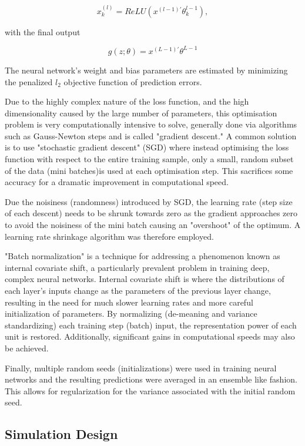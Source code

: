 \documentclass[man, a4paper, biblatex]{article}
\begin{document}
\begin{equation}
	x_k^{(l)} = ReLU(x^{(l-1)'}\theta_k^{l-1}),
\end{equation}

with the final output

\begin{equation}
	g(z;\theta) = x^{(L-1)'}\theta^{L-1}
\end{equation}

The neural network's weight and bias parameters are estimated by minimizing the penalized $l_2$ objective function of prediction errors.

Due to the highly complex nature of the loss function, and the high dimensionality caused by the large number of parameters, this optimisation problem is very computationally intensive to solve, generally done via algorithms such as Gauss-Newton steps and is called "gradient descent." A common solution is to use "stochastic gradient descent" (SGD) where instead optimising the loss function with respect to the entire training sample, only a small, random subset of the data (mini batches)is used at each optimisation step. This sacrifices some accuracy for a dramatic improvement in computational speed.

Due the noisiness (randomness) introduced by SGD, the learning rate (step size of each descent) needs to be shrunk towards zero as the gradient approaches zero to avoid the noisiness of the mini batch causing an "overshoot" of the optimum. A learning rate shrinkage algorithm was therefore employed.

"Batch normalization" is a technique for addressing a phenomenon known as internal covariate shift, a particularly prevalent problem in training deep, complex neural networks. Internal covariate shift is where the distributions of each layer's inputs change as the parameters of the previous layer change, resulting in the need for much slower learning rates and more careful initialization of parameters. By normalizing (de-meaning and variance standardizing) each training step (batch) input, the representation power of each unit is restored. Additionally, significant gains in computational speeds may also be achieved.

Finally, multiple random seeds (initializations) were used in training neural networks and the resulting predictions were averaged in an ensemble like fashion. This allows for regularization for the variance associated with the initial random seed.

\subsection{Simulation Design}
\end{document}
